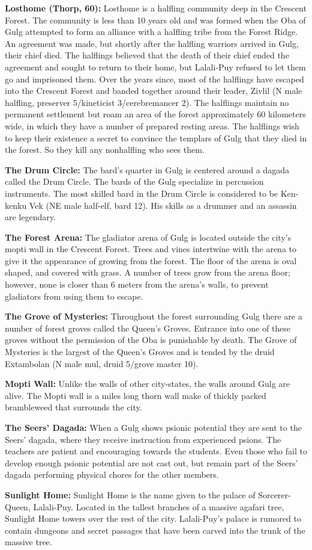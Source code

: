 {
	\textbf{Losthome (Thorp, 60):} Losthome is a halfling community deep in the Crescent Forest. The community is less than 10 years old and was formed when the Oba of Gulg attempted to form an alliance with a halfling tribe from the Forest Ridge. An agreement was made, but shortly after the halfling warriors arrived in Gulg, their chief died. The halflings believed that the death of their chief ended the agreement and sought to return to their home, but Lalali-Puy refused to let them go and imprisoned them. Over the years since, most of the halflings have escaped into the Crescent Forest and banded together around their leader, Zivlil (N male halfling, preserver 5/kineticist 3/cerebremancer 2). The halflings maintain no permanent settlement but roam an area of the forest approximately 60 kilometers wide, in which they have a number of prepared resting areas. The halflings wish to keep their existence a secret to convince the templars of Gulg that they died in the forest. So they kill any nonhalfling who sees them.
}
{
	\textbf{The Drum Circle:} The bard's quarter in Gulg is centered around a dagada called the Drum Circle. The bards of the Gulg specialize in percussion instruments. The most skilled bard in the Drum Circle is considered to be Ken-kenku Vek (NE male half-elf, bard 12). His skills as a drummer and an assassin are legendary.

	\textbf{The Forest Arena:} The gladiator arena of Gulg is located outside the city's mopti wall in the Crescent Forest. Trees and vines intertwine with the arena to give it the appearance of growing from the forest. The floor of the arena is oval shaped, and covered with grass. A number of trees grow from the arena floor; however, none is closer than 6 meters from the arena's walls, to prevent gladiators from using them to escape.

	\textbf{The Grove of Mysteries:} Throughout the forest surrounding Gulg there are a number of forest groves called the Queen's Groves. Entrance into one of these groves without the permission of the Oba is punishable by death. The Grove of Mysteries is the largest of the Queen's Groves and is tended by the druid Extambolan (N male mul, druid 5/grove master 10).

	\textbf{Mopti Wall:} Unlike the walls of other city-states, the walls around Gulg are alive. The Mopti wall is a miles long thorn wall make of thickly packed brambleweed that surrounds the city.

	\textbf{The Seers' Dagada:} When a Gulg shows psionic potential they are sent to the Seers' dagada, where they receive instruction from experienced psions. The teachers are patient and encouraging towards the students. Even those who fail to develop enough psionic potential are not cast out, but remain part of the Seers' dagada performing physical chores for the other members.

	\textbf{Sunlight Home:} Sunlight Home is the name given to the palace of Sorcerer-Queen, Lalali-Puy. Located in the tallest branches of a massive agafari tree, Sunlight Home towers over the rest of the city. Lalali-Puy's palace is rumored to contain dungeons and secret passages that have been carved into the trunk of the massive tree.
}
